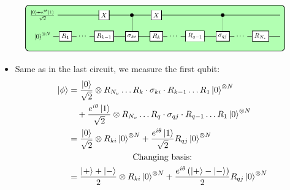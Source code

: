 \documentclass[professionalfonts]{beamer}
\newcommand{\ket}[1]{\ensuremath{\left|#1\right\rangle}}
\newcommand{\paren}[1]{\left( #1 \right)}
\newcommand{\elec}{N}
\begin{document}
\begin{frame}
\begin{figure}[ht!]
\includegraphics[width=\linewidth]{../circuits/circuit2}
\end{figure}
	\begin{itemize}
		\item Same as in the last circuit, we measure the first qubit:
\begin{equation*}
	\begin{split}
		\ket \phi
		&= \frac{\ket 0}{\sqrt 2} \otimes R_{N_v} \ldots R_k \cdot \sigma_{ki} \cdot R_{k-1} \ldots R_1 \ket 0^{\otimes \elec}\\
		&\quad + \frac{e^{i\theta}\ket 1}{\sqrt 2} \otimes R_{N_v} \ldots R_q \cdot \sigma_{qj} \cdot R_{q-1} \ldots R_1 \ket 0^{\otimes \elec}\\
		&= \frac{\ket 0}{\sqrt 2} \otimes R_{ki} \ket 0^{\otimes \elec}
		+ \frac{e^{i\theta}\ket 1}{\sqrt 2} R_{qj}\ket 0^{\otimes \elec}\\
		\span\text{Changing basis:}\\
		&= \frac{\ket + + \ket -}{2} \otimes R_{ki} \ket 0^{\otimes \elec}
		+ \frac{e^{i\theta}\paren{\ket + - \ket -}}{2} R_{qj}\ket 0^{\otimes \elec}
	\end{split}
\end{equation*}
	\end{itemize}
\end{frame}
\end{document}
